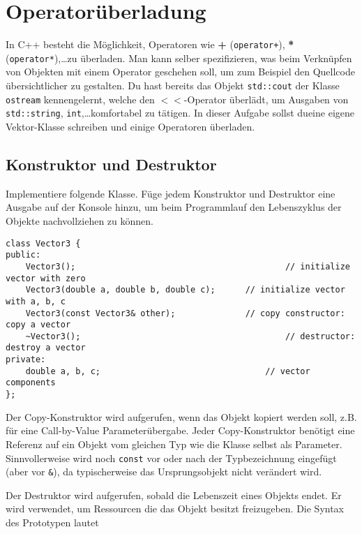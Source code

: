 \section{Operatorüberladung}
In C++ besteht die Möglichkeit, Operatoren wie \textbf{+} (\texttt{operator+}), \textbf{*} (\texttt{operator*}),\dots zu überladen.
Man kann selber spezifizieren, was beim Verknüpfen von Objekten mit einem Operator geschehen soll, um zum Beispiel den Quellcode übersichtlicher zu gestalten.
Du hast bereits das Objekt \texttt{std::cout} der Klasse \texttt{ostream} kennengelernt, welche den $<<$-Operator überlädt, um Ausgaben von \texttt{std::string}, \texttt{int},\dots komfortabel zu tätigen.
In dieser Aufgabe sollst dueine eigene Vektor-Klasse schreiben und einige Operatoren überladen.


\subsection{Konstruktor und Destruktor}
Implementiere folgende Klasse.
Füge jedem Konstruktor und Destruktor eine Ausgabe auf der Konsole hinzu, um beim Programmlauf den Lebenszyklus der Objekte nachvollziehen zu können.

\begin{lstlisting}
class Vector3 {
public:
	Vector3();											// initialize vector with zero
	Vector3(double a, double b, double c);		// initialize vector with a, b, c
	Vector3(const Vector3& other);				// copy constructor: copy a vector
	~Vector3();											// destructor: destroy a vector
private:
	double a, b, c;									// vector components
};
\end{lstlisting}

Der Copy-Konstruktor wird aufgerufen, wenn das Objekt kopiert werden soll, z.B. für eine Call-by-Value Parameterübergabe.
Jeder Copy-Konstruktor benötigt eine Referenz auf ein Objekt vom gleichen Typ wie die Klasse selbst als Parameter. 
Sinnvollerweise wird noch \texttt{const} vor oder nach der Typbezeichnung eingefügt (aber vor \texttt{\&}), da typischerweise das Ursprungsobjekt nicht verändert wird.

Der Destruktor wird aufgerufen, sobald die Lebenszeit eines Objekts endet. Er wird verwendet, um Ressourcen die das Objekt besitzt freizugeben.
Die Syntax des Prototypen lautet

